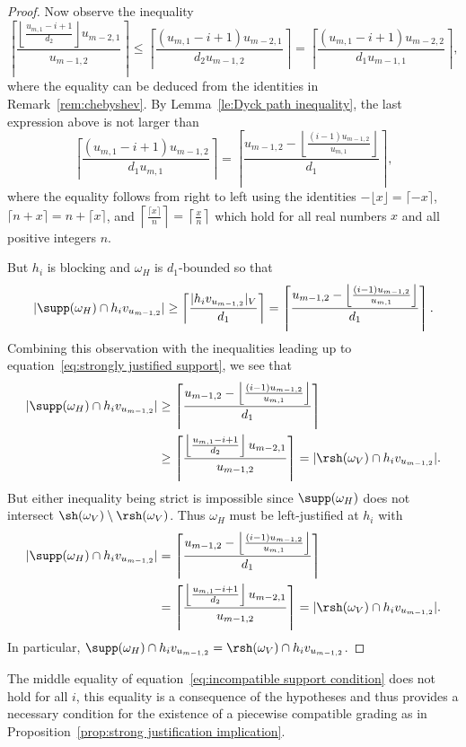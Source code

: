 \begin{proof}
 Now observe the inequality 
 \[\left\lceil\frac{\left\lfloor\frac{u_{m,1}-i+1}{d_2}\right\rfloor u_{m-2,1}}{u_{m-1,2}}\right\rceil\le\left\lceil\frac{(u_{m,1}-i+1)u_{m-2,1}}{d_2u_{m-1,2}}\right\rceil=\left\lceil\frac{(u_{m,1}-i+1)u_{m-2,2}}{d_1u_{m-1,1}}\right\rceil,\] 
 where the equality can be deduced from the identities in Remark~\ref{rem:chebyshev}.
 By Lemma~\ref{le:Dyck path inequality}, the last expression above is not larger than 
 \begin{equation}
 \label{eq:strongly justified support}
 \left\lceil\frac{(u_{m,1}-i+1)u_{m-1,2}}{d_1u_{m,1}}\right\rceil=\left\lceil\frac{u_{m-1,2}-\left\lfloor\frac{(i-1)u_{m-1,2}}{u_{m,1}}\right\rfloor}{d_1}\right\rceil,
 \end{equation}
 where the equality follows from right to left using the identities $-\lfloor x\rfloor=\lceil-x\rceil$, $\lceil n+x\rceil=n+\lceil x\rceil$, and $\left\lceil\frac{\lceil x\rceil}{n}\right\rceil=\left\lceil\frac{x}{n}\right\rceil$ which hold for all real numbers $x$ and all positive integers $n$.
 
 But $h_i$ is blocking and $\omega_H$ is $d_1$-bounded so that
 \[|\supp(\omega_H)\cap h_iv_{u_{m-1,2}}|\ge\left\lceil\frac{|h_iv_{u_{m-1,2}}|_V}{d_1}\right\rceil=\left\lceil\frac{u_{m-1,2}-\left\lfloor\frac{(i-1)u_{m-1,2}}{u_{m,1}}\right\rfloor}{d_1}\right\rceil.\]
 Combining this observation with the inequalities leading up to equation~\eqref{eq:strongly justified support}, we see that
 \begin{align*}
 |\supp(\omega_H)\cap h_iv_{u_{m-1,2}}|
 &\ge\left\lceil\frac{u_{m-1,2}-\left\lfloor\frac{(i-1)u_{m-1,2}}{u_{m,1}}\right\rfloor}{d_1}\right\rceil\\
 &\ge\left\lceil\frac{\left\lfloor\frac{u_{m,1}-i+1}{d_2}\right\rfloor u_{m-2,1}}{u_{m-1,2}}\right\rceil=|\rsh(\omega_V)\cap h_iv_{u_{m-1,2}}|.
 \end{align*}
 But either inequality being strict is impossible since $\supp(\omega_H)$ does not intersect $\sh(\omega_V)\setminus\rsh(\omega_V)$. 
 Thus $\omega_H$ must be left-justified at $h_i$ with 
 \begin{align}
 \label{eq:incompatible support condition}
 |\supp(\omega_H)\cap h_iv_{u_{m-1,2}}|
 &=\left\lceil\frac{u_{m-1,2}-\left\lfloor\frac{(i-1)u_{m-1,2}}{u_{m,1}}\right\rfloor}{d_1}\right\rceil\\
 \nonumber &=\left\lceil\frac{\left\lfloor\frac{u_{m,1}-i+1}{d_2}\right\rfloor u_{m-2,1}}{u_{m-1,2}}\right\rceil=|\rsh(\omega_V)\cap h_iv_{u_{m-1,2}}|.
 \end{align}
 In particular, $\supp(\omega_H)\cap h_iv_{u_{m-1,2}}=\rsh(\omega_V)\cap h_iv_{u_{m-1,2}}$.
\end{proof}
\begin{remark}
 The middle equality of equation~\eqref{eq:incompatible support condition} does not hold for all $i$, this equality is a consequence of the hypotheses and thus provides a necessary condition for the existence of a piecewise compatible grading as in Proposition~\ref{prop:strong justification implication}.
\end{remark} 


